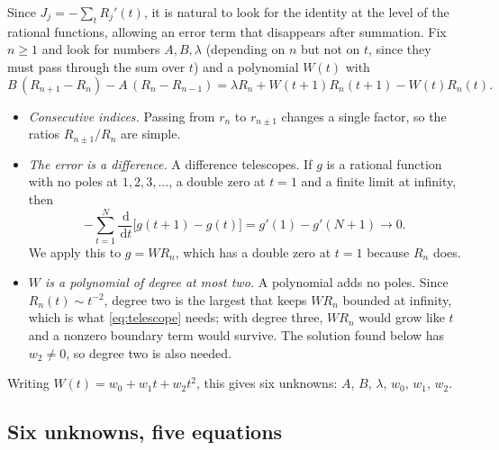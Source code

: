 \documentclass[11pt]{article}
\newcommand{\dd}{\,\mathrm{d}}
\theoremstyle{plain}
\theoremstyle{definition}
\theoremstyle{remark}
\begin{document}
Since $J_j=-\sum_tR_j'(t)$, it is natural to look for the identity at the level of the rational
functions, allowing an error term that disappears after summation. Fix $n\ge1$ and look for
numbers $A,B,\lambda$ (depending on $n$ but not on $t$, since they must pass through the sum over
$t$) and a polynomial $W(t)$ with
\begin{equation}\label{eq:ansatz}
  B\,(R_{n+1}-R_n)-A\,(R_n-R_{n-1})=\lambda R_n+W(t+1)R_n(t+1)-W(t)R_n(t).
\end{equation}
\begin{itemize}
  \item \emph{Consecutive indices.} Passing from $r_n$ to $r_{n\pm1}$ changes a single factor, so
    the ratios $R_{n\pm1}/R_n$ are simple.
  \item \emph{The error is a difference.} A difference telescopes. If $g$ is a rational function
    with no poles at $1,2,3,\dots$, a double zero at $t=1$ and a finite limit at infinity, then
    \begin{equation}\label{eq:telescope}
      -\sum_{t=1}^N\frac{\dd}{\dd t}\bigl[g(t+1)-g(t)\bigr]=g'(1)-g'(N+1)\longrightarrow0 .
    \end{equation}
    We apply this to $g=WR_n$, which has a double zero at $t=1$ because $R_n$ does.
  \item \emph{$W$ is a polynomial of degree at most two.} A polynomial adds no poles. Since
    $R_n(t)\sim t^{-2}$, degree two is the largest that keeps $WR_n$ bounded at infinity, which is
    what \eqref{eq:telescope} needs; with degree three, $WR_n$ would grow like $t$ and a nonzero
    boundary term would survive. The solution found below has $w_2\ne0$, so degree two is also
    needed.
\end{itemize}
Writing $W(t)=w_0+w_1t+w_2t^2$, this gives six unknowns: $A$, $B$, $\lambda$, $w_0$, $w_1$, $w_2$.

\subsection{Six unknowns, five equations}
\end{document}
